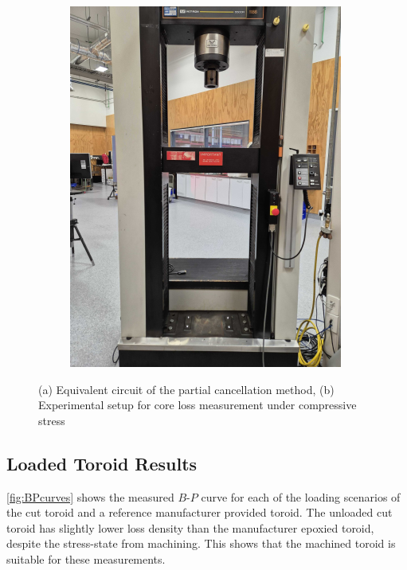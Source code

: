 \documentclass[conference]{IEEEtran}
\begin{document}
\begin{figure}[t]
  \begin{subfigure}{\columnwidth}
    \centering
    
    \caption{}
    \label{fig:partialcancellationcircuit}
  \end{subfigure}

  \vspace{1em}

  \begin{subfigure}{\columnwidth}
    \centering
    \includegraphics{figures/experimentalsetup.pdf}
    \caption{}
    \label{fig:experimentalsetup}
  \end{subfigure}
  \caption{(a) Equivalent circuit of the partial cancellation method, (b) Experimental setup for core loss measurement under compressive stress}
\end{figure}
\subsection{Loaded Toroid Results}

\cref{fig:BPcurves} shows the measured $B$-$P$ curve for each of the loading scenarios of the cut toroid and a reference manufacturer provided toroid. 
The unloaded cut toroid has slightly lower loss density than the manufacturer epoxied toroid, despite the stress-state from machining. 
This shows that the machined toroid is suitable for these measurements. 
\end{document}
